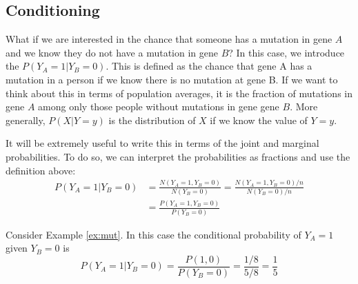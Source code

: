 \subsection{Conditioning}
 What if we are interested in the chance that someone has a mutation in gene $A$ and we know they do not have a mutation in gene $B$?  In this case, we introduce the  $P(Y_A=1|Y_B=0)$. This is defined as the chance that gene A has a mutation in a person if we know there is no mutation at gene B. If we want to think about this in terms of population averages, it is the fraction of mutations in gene $A$ among only those people without mutations in gene gene $B$. 
 More generally, $P(X|Y=y)$ is the distribution of $X$ if we know the value of $Y=y$. 
 
 
 It will be extremely useful to write this in terms of the joint and marginal probabilities. To do so, we can interpret the probabilities as fractions and use the definition above:  
\begin{align*}
P(Y_A=1|Y_B=0) &= \frac{N(Y_A = 1,Y_B= 0)}{N(Y_B=0)} = \frac{N(Y_A = 1,Y_B = 0)/n}{N(Y_B=0)/n} \\
&= \frac{P(Y_A = 1,Y_B = 0)}{P(Y_B = 0)}
\end{align*}


\begin{example}
Consider Example \ref{ex:mut}. In this case the conditional probability of $Y_A = 1$ given $Y_B=0$ is 
\begin{equation*}
P(Y_A = 1|Y_B = 0) = \frac{P(1,0)}{P(Y_B = 0)} = \frac{1/8}{5/8} = \frac{1}{5} 
\end{equation*}

\end{example}


